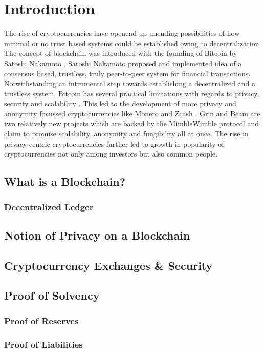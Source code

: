 
\newcommand{\etas}{\ensuremath{\eta_{\mathrm{s}}}}


\chapter{Introduction}

The rise of cryptocurrencies have openend up unending possibilities of how minimal or no trust based systems could be established owing to decentralization.
The concept of blockchain was introduced with the founding of Bitcoin by Satoshi Nakamoto \cite{Nakamoto2009}.
Satoshi Nakamoto proposed and implemented idea of a consensus based, trustless, truly peer-to-peer system for financial transactions.  
Notwithstanding an intrumental step towards establishing a decentralized and a trustless system, Bitcoin has several practical limitations with regards to privacy, security and scalability \cite{Conti2018}.   
This led to the development of more privacy and anonymity focussed cryptocurrencies like Monero \cite{Saberhagen2013} and Zcash \cite{Sasson2014}.
Grin \cite{GrinWebsite} and Beam \cite{BeamWebsite} are two relatively new projects which are backed by the MimbleWimble protocol \cite{Poelstra2016} and claim to promise scalability, anonymity and fungibility all at once.
The rise in privacy-centric cryptocurrencies further led to growth in popularity of cryptocurrencies not only among investors but also common people.


\section{What is a Blockchain?}
\label{scn:blockchain}

\subsection{Decentralized Ledger}




\section{Notion of Privacy on a Blockchain}

\section{Cryptocurrency Exchanges \& Security}

\section{Proof of Solvency}

\subsection{Proof of Reserves}
\subsection{Proof of Liabilities}





